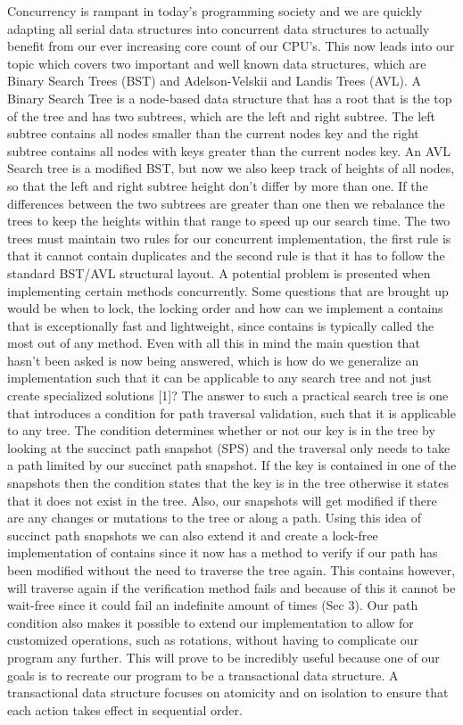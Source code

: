 \documentclass[conference]{IEEEtran}
\begin{document}
Concurrency is rampant in today's programming society and we are quickly adapting all serial data structures into concurrent data structures to actually benefit from our ever increasing core count of our CPU's. This now leads into our topic which covers two important and well known data structures, which are Binary Search Trees (BST) and Adelson-Velskii and Landis Trees (AVL). A Binary Search Tree is a node-based data structure that has a root that is the top of the tree and has two subtrees, which are the left and right subtree. The left subtree contains all nodes smaller than the current nodes key and the right subtree contains all nodes with keys greater than the current nodes key. An AVL Search tree is a modified BST, but now we also keep track of heights of all nodes, so that the left and right subtree height don't differ by more than one. If the differences between the two subtrees are greater than one then we rebalance the trees to keep the heights within that range to speed up our search time. The two trees must maintain two rules for our concurrent implementation, the first rule is that it cannot contain duplicates and the second rule is that it has to follow the standard BST/AVL structural layout.
	A potential problem is presented when implementing certain methods concurrently. Some questions that are brought up would be when to lock, the locking order and how can we implement a contains that is exceptionally fast and lightweight, since contains is typically called the most out of any method. Even with all this in mind the main question that hasn't been asked is now being answered, which is how do we generalize an implementation such that it can be applicable to any search tree and not just create specialized solutions [1]? The answer to such a practical search tree is one that introduces a condition for path traversal validation, such that it is applicable to any tree. The condition determines whether or not our key is in the tree by looking at the succinct path snapshot (SPS) and the traversal only needs to take a path limited by our succinct path snapshot. If the key is contained in one of the snapshots then the condition states that the key is in the tree otherwise it states that it does not exist in the tree.  Also, our snapshots will get modified if there are any changes or mutations to the tree or along a path. Using this idea of succinct path snapshots we can also extend it and create a lock-free implementation of contains since it now has a method to verify if our path has been modified without the need to traverse the tree again. This contains however, will traverse again if the verification method fails and because of this it cannot be wait-free since it could fail an indefinite amount of times (Sec 3).
	Our path condition also makes it possible to extend our implementation to allow for customized operations, such as rotations, without having to complicate our program any further. This will prove to be incredibly useful because one of our goals is to recreate our program to be a transactional data structure. A transactional data structure focuses on atomicity and on isolation to ensure that each action takes effect in sequential order.
\end{document}
